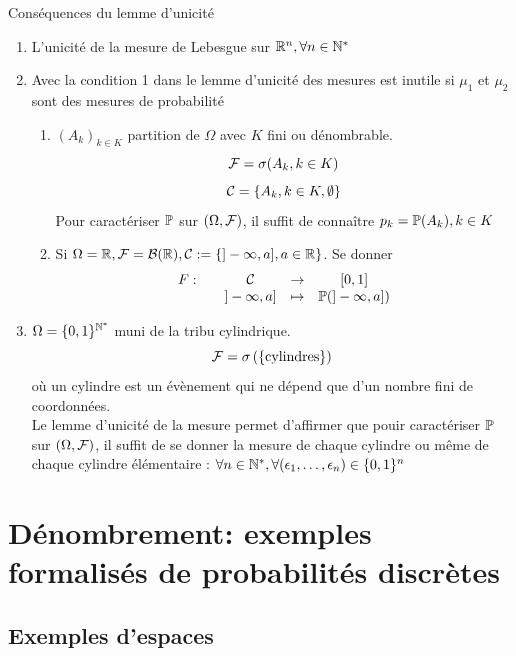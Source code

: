 \documentclass[]{report}
\begin{document}
\begin{prop}{Conséquences du lemme d'unicité}{}
    \begin{enumerate}
        \item L'unicité de la mesure de Lebesgue sur $\mathbb{R}^n,\forall n\in \mathbb{N}^*$
        \item Avec la condition 1 dans le lemme d'unicité des mesures est inutile si $\mu_1$ et $\mu_2$ sont des mesures de probabilité
              \begin{enumerate}
                  \item $(A_k)_{k\in K}$ partition de $\Omega$ avec $K$ fini ou dénombrable.
                        \[\mathcal{F}=\sigma(A_k,k\in K)\]
                        \[\mathcal{C}=\{A_k,k\in K,\emptyset\}\]
                        Pour caractériser $\mathbb{P}$ sur $(\Omega,\mathcal{F})$, il suffit de connaître $p_k=\mathbb{P}(A_k),k\in K$
                  \item Si $\Omega=\mathbb{R},\mathcal{F}=\mathcal{B}(\mathbb{R}),\mathcal{C}:=\{]-\infty,a],a\in \mathbb{R}\}$. Se donner
                        \[\begin{array}{ccccc} F : & & \mathcal{C} & \to & [0,1] \\ & & ]-\infty,a] & \mapsto & \mathbb{P}(]-\infty,a]) \end{array}\]
              \end{enumerate}
        \item $\Omega=\{0,1\}^{\mathbb{N}^*}$ muni de la tribu cylindrique.
              \[\mathcal{F}=\sigma\left(\{\text{cylindres}\}\right)\]
              où un cylindre est un évènement qui ne dépend que d'un nombre fini de coordonnées.\\
              Le lemme d'unicité de la mesure permet d'affirmer que pouir caractériser $\mathbb{P}$ sur $(\Omega,\mathcal{F})$, il suffit de se donner la mesure de chaque cylindre ou même de chaque cylindre élémentaire : $\forall n\in \mathbb{N}^*,\forall (\epsilon_1,\ldots,\epsilon_n)\in \{0,1\}^n$
    \end{enumerate}
\end{prop}

\section{Dénombrement: exemples formalisés de probabilités discrètes}

\subsection{Exemples d'espaces}
\end{document}
